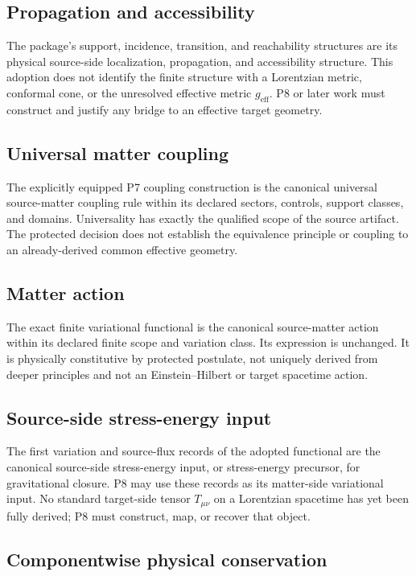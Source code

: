 \documentclass[11pt]{article}
\begin{document}
\subsection{Propagation and accessibility}

The package's support, incidence, transition, and reachability structures are
its physical source-side localization, propagation, and accessibility
structure.  This adoption does not identify the finite structure with a
Lorentzian metric, conformal cone, or the unresolved effective metric
$g_{\mathrm{eff}}$.  P8 or later work must construct and justify any bridge
to an effective target geometry.

\subsection{Universal matter coupling}

The explicitly equipped P7 coupling construction is the canonical universal
source-matter coupling rule within its declared sectors, controls, support
classes, and domains.  Universality has exactly the qualified scope of the
source artifact.  The protected decision does not establish the equivalence
principle or coupling to an already-derived common effective geometry.

\subsection{Matter action}

The exact finite variational functional is the canonical source-matter action
within its declared finite scope and variation class.  Its expression is
unchanged.  It is physically constitutive by protected postulate, not uniquely
derived from deeper principles and not an Einstein--Hilbert or target
spacetime action.

\subsection{Source-side stress-energy input}

The first variation and source-flux records of the adopted functional are the
canonical source-side stress-energy input, or stress-energy precursor, for
gravitational closure.  P8 may use these records as its matter-side
variational input.  No standard target-side tensor $T_{\mu\nu}$ on a
Lorentzian spacetime has yet been fully derived; P8 must construct, map, or
recover that object.

\subsection{Componentwise physical conservation}
\end{document}
